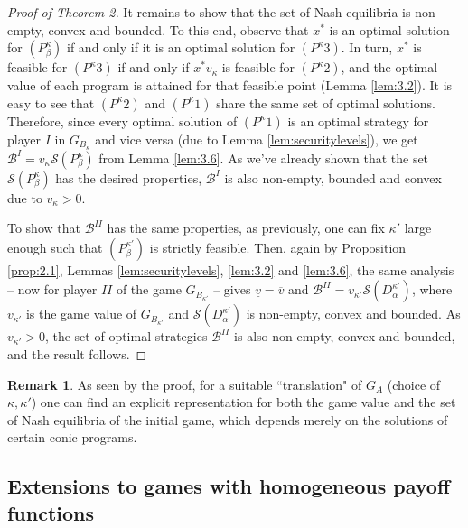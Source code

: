 \documentclass[11pt, twoside]{article}
\numberwithin{equation}{section}
\theoremstyle{definition}
\newtheorem{remark}{Remark}[section]
\begin{document}
\begin{proof}[\textit{Proof of Theorem 2}]
It remains to show that the set of Nash equilibria is non-empty, convex and bounded. To this end, observe that $x^*$ is an optimal solution for $(P^\kappa_\beta)$ if and only if it is an optimal solution for $(P^\kappa 3)$. In turn, $x^*$ is feasible for $(P^\kappa 3)$ if and only if $x^*v_\kappa$ is feasible for $(P^\kappa 2)$, and the optimal value of each program is attained for that feasible point (Lemma \ref{lem:3.2}). It is easy to see that $(P^\kappa 2)$ and $(P^\kappa 1)$ share the same set of optimal solutions. Therefore, since every optimal solution of $(P^\kappa 1)$ is an optimal strategy for player $I$ in $G_{B_\kappa}$ and vice versa (due to Lemma \ref{lem:securitylevels}), we get $\mathcal{B}^I=v_\kappa \mathcal{S}(P^\kappa_\beta)$ from Lemma \ref{lem:3.6}. As we've already shown that the set $\mathcal{S}(P^\kappa_\beta)$ has the desired properties, $\mathcal{B}^{I}$ is also non-empty, bounded and convex due to $v_\kappa>0$.\par

To show that $\mathcal{B}^{II}$ has the same properties, as previously, one can fix $\kappa'$ large enough such that $(P_\beta^{\kappa'})$ is strictly feasible. Then, again by Proposition \ref{prop:2.1}, Lemmas \ref{lem:securitylevels}, \ref{lem:3.2} and \ref{lem:3.6}, the same analysis -- now for player $II$ of the game $G_{B_{\kappa'}}$ -- gives $\underline{v}=\overline{v}$ and $\mathcal{B}^{II}=v_{\kappa'}\mathcal{S}(D^{\kappa'}_\alpha)$, where $v_{\kappa'}$ is the game value of $G_{B_{\kappa'}}$ and $\mathcal{S}(D^{\kappa'}_\alpha)$ is non-empty, convex and bounded. As $v_{\kappa'}>0$, the set of optimal strategies $\mathcal{B}^{II}$ is also non-empty, convex and bounded, and the result follows.
\end{proof}
\begin{remark}
    As seen by the proof, for a suitable ``translation" of $G_A$ (choice of $\kappa,\kappa'$) one can find an explicit representation for both the game value and the set of Nash equilibria of the initial game, which depends merely on the solutions of certain conic programs.
\end{remark}

\vspace{-0.1cm}\subsection{Extensions to games with homogeneous payoff functions}\label{sec:3.3}\vspace{-0.2cm}
\end{document}

